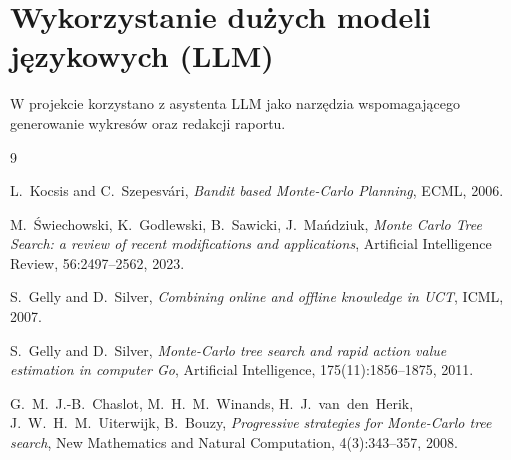 \documentclass[11pt,a4paper]{article}
\begin{document}
\section{Wykorzystanie dużych modeli językowych (LLM)}
\label{sec:llm}

W projekcie korzystano z asystenta LLM
jako narzędzia wspomagającego generowanie wykresów oraz redakcji raportu. 


\begin{thebibliography}{9}

L.~Kocsis and C.~Szepesvári,
\emph{Bandit based Monte-Carlo Planning},
ECML, 2006.

M.~Świechowski, K.~Godlewski, B.~Sawicki, J.~Mańdziuk,
\emph{Monte Carlo Tree Search: a review of recent modifications and
applications},
Artificial Intelligence Review, 56:2497--2562, 2023.

S.~Gelly and D.~Silver,
\emph{Combining online and offline knowledge in UCT},
ICML, 2007.

S.~Gelly and D.~Silver,
\emph{Monte-Carlo tree search and rapid action value estimation in
computer Go},
Artificial Intelligence, 175(11):1856--1875, 2011.

G.~M.~J.-B.~Chaslot, M.~H.~M.~Winands, H.~J.~van~den~Herik,
J.~W.~H.~M.~Uiterwijk, B.~Bouzy,
\emph{Progressive strategies for Monte-Carlo tree search},
New Mathematics and Natural Computation, 4(3):343--357, 2008.

\end{thebibliography}
\end{document}
